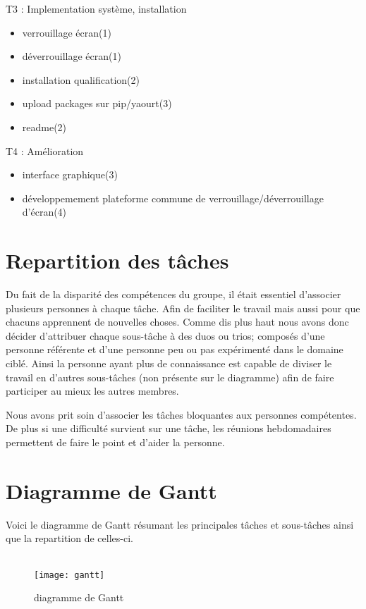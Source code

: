 T3 : Implementation système, installation
\begin{itemize}
  \item{verrouillage écran(1)}
  \item{déverrouillage écran(1)}
  \item{installation qualification(2)}
  \item{upload packages sur pip/yaourt(3)}
  \item{readme(2)}
\end{itemize}

T4 : Amélioration
\begin{itemize}
  \item{interface graphique(3)}
  \item{développemement plateforme commune de verrouillage/déverrouillage
        d’écran(4)}
\end{itemize}

\section{Repartition des tâches}

Du fait de la disparité des compétences du groupe, il était essentiel
d'associer plusieurs personnes à chaque tâche. Afin de faciliter le travail
mais aussi pour que chacuns apprennent de nouvelles choses. Comme dis plus haut
nous avons donc
décider d'attribuer chaque sous-tâche à des duos ou trios; composés d'une
personne référente et d'une personne peu ou pas expérimenté dans le domaine
ciblé. Ainsi la personne ayant plus de connaissance est capable de diviser
le travail en d'autres sous-tâches (non présente sur le diagramme) afin de faire
participer au mieux les autres membres.

Nous avons prit soin d'associer les tâches bloquantes aux personnes
compétentes. De plus si une difficulté survient sur une tâche,
les réunions hebdomadaires permettent de faire le point et d'aider la
personne.

\section{Diagramme de Gantt}
Voici le diagramme de Gantt résumant les principales tâches et sous-tâches
ainsi que la repartition de celles-ci.
\\
\\
\begin{figure}[h]
  \texttt{[image: gantt]}
  \caption{diagramme de Gantt}
\end{figure}
